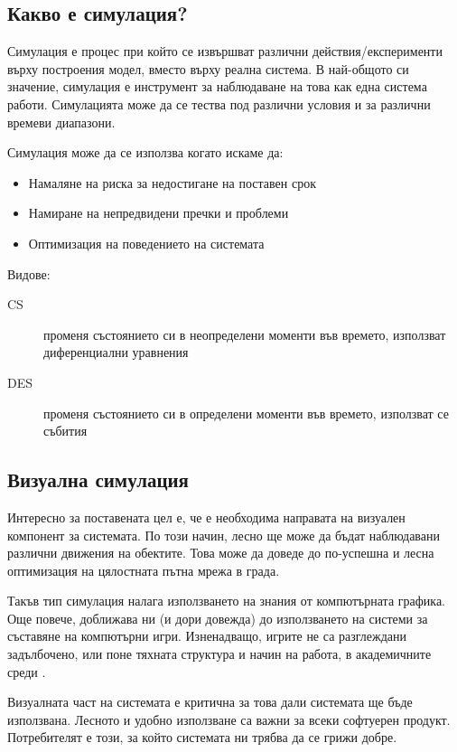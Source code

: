 	\subsection{Какво е симулация?}
	
		Симулация е процес при който се извършват различни действия/експерименти върху построения модел, 
		вместо върху реална система. В най-общото си значение, симулация е инструмент за наблюдаване на това
		как една система работи. Симулацията може да се тества под различни условия и за различни времеви диапазони.
		
		Симулация може да се използва когато искаме да:
		
		\begin{itemize}
			\item Намаляне на риска за недостигане на поставен срок		
 			\item Намиране на непредвидени пречки и проблеми
 			\item Оптимизация на поведението на системата
		\end{itemize}
		
		Видове:
		
		\begin{description}
			\item[\ac{CS}] променя състоянието си в неопределени моменти във времето,
			 използват диференциални уравнения
			\item[\ac{DES}] променя състоянието си в определени моменти във
			 времето, използват се събития
		\end{description}
		
	\subsection{Визуална симулация}
	
		Интересно за поставената цел е, че е необходима направата на визуален компонент за системата.
		По този начин, лесно ще може да бъдат наблюдавани различни движения на обектите. Това може да 
		доведе до по-успешна и лесна оптимизация на цялостната пътна мрежа в града.
		
		Такъв тип симулация налага използването на знания от компютърната графика. 
		Още повече, доближава ни (и дори довежда) до използването на системи за съставяне на компютърни игри. 
		Изненадващо, игрите не са разглеждани задълбочено, или поне тяхната структура и начин на работа, 
		в академичните среди \cite{Holzkorn}.
		
		Визуалната част на системата е критична за това дали системата ще бъде използвана.
		Лесното и удобно използване са важни за всеки софтуерен продукт. 
		Потребителят е този, за който системата ни трябва да се грижи добре. \cite{Microsoft}
		
